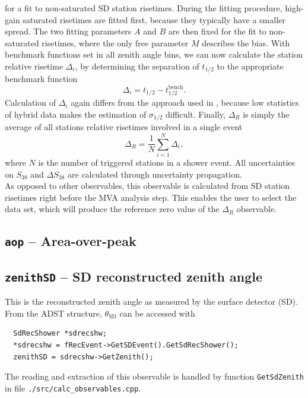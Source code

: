 \documentclass[12pt,a4paper]{report}
\begin{document}
for a fit to non-saturated SD station risetimes. During the fitting procedure, high-gain saturated risetimes are fitted first, because they typically have a smaller spread. The two fitting parameters $A$ and $B$ are then fixed for the fit to non-saturated risetimes, where the only free parameter $M$ describes the bias. With benchmark functions set in all zenith angle bins, we can now calculate the station relative risetime $\Delta_i$, by determining the separation of $t_{1/2}$ to the appropriate benchmark function
\begin{equation}
\Delta_i = t_{1/2} - t_{1/2}^{\textrm{bench}}.
\end{equation}
Calculation of $\Delta_i$ again differs from the approach used in \cite{deltaMethod}, because low statistics of hybrid data makes the estimation of $\sigma_{1/2}$ difficult. Finally, $\Delta_R$ is simply the average of all stations relative risetimes involved in a single event
\begin{equation}
\Delta_R = \frac{1}{N} \displaystyle\sum_{i = 1}^{N} \Delta_i,
\end{equation}
where $N$ is the number of triggered stations in a shower event. All uncertainties on $S_{38}$ and $\Delta S_{38}$ are calculated through uncertainty propagation.\\
As opposed to other observables, this observable is calculated from SD station risetimes right before the MVA analysis step. This enables the user to select the data set, which will produce the reference zero value of the $\Delta_R$ observable.

\subsection{\texttt{aop} -- Area-over-peak}

\subsection{\texttt{zenithSD} -- SD reconstructed zenith angle}
This is the reconstructed zenith angle as measured by the surface detector (SD). From the ADST structure, $\theta_{\textrm{SD}}$ can be accessed with
\begin{verbatim}
  SdRecShower *sdrecshw;
  *sdrecshw = fRecEvent->GetSDEvent().GetSdRecShower();
  zenithSD = sdrecshw->GetZenith();
\end{verbatim}
The reading and extraction of this observable is handled by function \texttt{GetSdZenith} in file \texttt{./src/calc\_observables.cpp}.
\end{document}

